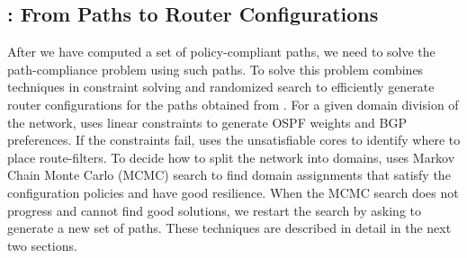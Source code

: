 \subsection{\name: From Paths to Router Configurations} 
After we have computed a set of policy-compliant paths,
we need to solve the path-compliance problem using such paths.
To solve this problem \name
combines techniques in constraint solving and randomized search
to efficiently generate router configurations for the paths obtained from \genesis.
For a given domain division of the network,
\name uses linear constraints to generate OSPF weights and BGP preferences.
If the constraints fail, \name uses the unsatisfiable cores to
identify where to place route-filters.
To decide how to split the network into domains,
\name uses Markov Chain Monte Carlo (MCMC) search to find
domain assignments that satisfy the configuration policies and have good resilience.
When the MCMC search does not progress and cannot find good solutions,
we restart the search by asking \genesis to generate a new set of paths.
These techniques are described in detail in the next two sections.


